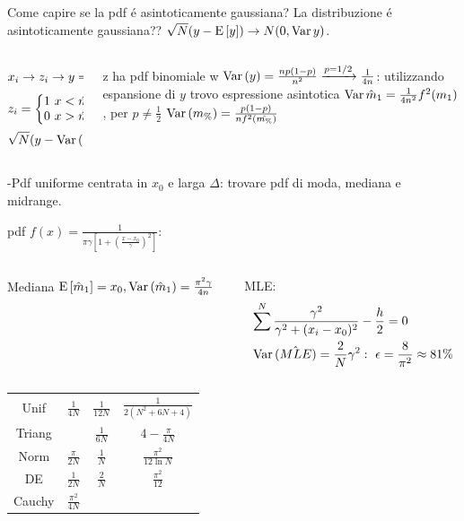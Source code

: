 \documentclass[asd-beamer.tex]{subfiles}
\begin{document}
\begin{wordonframe}{Come capire se la pdf \'e asintoticamente gaussiana?}
La distribuzione \'e asintoticamente gaussiana?? $\sqrt{N}(y-\operatorname{E}{[y]})\to N(0,\operatorname{Var}{y})$.
\begin{columns}[T]
\begin{column}{0.5\textwidth}
\begin{align*}
&x_i\to z_i\to y=\frac{1}{N}\sum z_i\\
&z_i=\left\{\begin{matrix}1\ x<\hat{m}_1\\0\ x>\hat{m}_1\\\end{matrix}\right.\\
&\sqrt{N}(y-\operatorname{Var}{(y)})\xrightarrow{\operatorname{\mathcal{P}}{}}N(0,\operatorname{Var}{(y)})
\end{align*}
\end{column}
\begin{column}{0.5\textwidth}
z ha pdf binomiale w $\operatorname{Var}{(y)}=\frac{np(1-p)}{n^2}\xrightarrow{p=1/2}\frac{1}{4n}$: utilizzando espansione di $y$ trovo espressione asintotica $\operatorname{Var}{\hat{m}_1}=\frac{1}{4n^2}f^2(m_1)$, per $p\neq\frac{1}{2}$ $\operatorname{Var}{(m_{\%})}=\frac{p(1-p)}{nf^2(\hat{m_{\%}})}$
\end{column}
\end{columns}

-Pdf uniforme centrata in $x_0$ e larga $\Delta$: trovare pdf di moda, mediana e midrange.

pdf $f(x)=\frac{1}{\pi\gamma[1+(\frac{x-x_0}{\gamma})^2]}$:
\begin{columns}[T]
\begin{column}{0.5\textwidth}
Mediana
$\operatorname{E}{[\hat{m}_1]}=x_0, \operatorname{Var}{(\hat{m}_1)}=\frac{\pi^2\gamma}{4n}$
\end{column}
\begin{column}{0.5\textwidth}
MLE:
\begin{align*}
&\sum^N\frac{\gamma^2}{\gamma^2+(x_i-x_0)^2}-\frac{h}{2}=0\\
&\operatorname{Var}{(\hat{MLE})}=\frac{2}{N}\gamma^2:\ \epsilon=\frac{8}{\pi^2}\approx81\%
\end{align*}
\end{column}
\end{columns}

\begin{tabular}{c|ccc}
Unif & $\frac{1}{4N}$ & $\frac{1}{12N}$ & $\frac{1}{2(N^2+6N+4)}$\\
Triang & & $\frac{1}{6N}$ & $4-\frac{\pi}{4N}$\\
Norm & $\frac{\pi}{2N}$ & $\frac{1}{N}$ & $\frac{\pi^2}{12\ln{N}}$\\
DE & $\frac{1}{2N}$ & $\frac{2}{N}$ & $\frac{\pi^2}{12}$\\
Cauchy & $\frac{\pi^2}{4N}$ & & \\
\end{tabular}\end{wordonframe}
\end{document}
